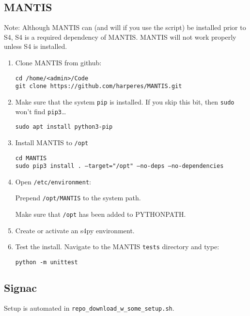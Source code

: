 \subsection{MANTIS} \label{subsec:installMANTIS}

Note: Although MANTIS can (and will if you use the script) be installed prior to S4, S4 is a required dependency of MANTIS. MANTIS will not work properly unless S4 is installed.

\begin{enumerate}
\item Clone MANTIS from github:

	\texttt{cd /home/<admin>/Code} \\
	\texttt{git clone https://github.com/harperes/MANTIS.git}

\item Make sure that the system \texttt{pip} is installed. If you skip this bit, then \texttt{sudo} won't find \texttt{pip3}\dots

	\texttt{sudo apt install python3-pip}

\item Install MANTIS to \texttt{/opt}

\texttt{cd MANTIS} \\
\texttt{sudo pip3 install . --target="/opt" --no-deps --no-dependencies}

\item Open \texttt{/etc/environment}:

	Prepend \texttt{/opt/MANTIS} to the system path.
	
	Make sure that \texttt{/opt} has been added to PYTHONPATH.

\item Create or activate an s4py environment. 

\item Test the install. Navigate to the MANTIS \texttt{tests} directory and type:
	
	\texttt{python -m unittest}

\end{enumerate}

\subsection{Signac} \label{subsec:installSignac}

Setup is automated in \texttt{repo\_download\_w\_some\_setup.sh}.

